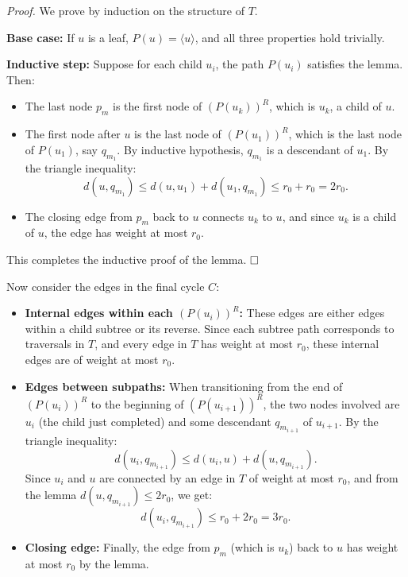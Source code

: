 \documentclass[11pt]{article}
\begin{document}
\begin{description}
\begin{enumerate}
\textit{Proof.} We prove by induction on the structure of $T$.

\textbf{Base case:} If $u$ is a leaf, $P(u) = \langle u \rangle$, and all three properties hold trivially.

\textbf{Inductive step:} Suppose for each child $u_i$, the path $P(u_i)$ satisfies the lemma. Then:
\begin{itemize}
  \item The last node $p_m$ is the first node of $(P(u_k))^R$, which is $u_k$, a child of $u$.
  \item The first node after $u$ is the last node of $(P(u_1))^R$, which is the last node of $P(u_1)$, say $q_{m_1}$. By inductive hypothesis, $q_{m_1}$ is a descendant of $u_1$. By the triangle inequality:
  \[
  d(u, q_{m_1}) \le d(u, u_1) + d(u_1, q_{m_1}) \le r_0 + r_0 = 2r_0.
  \]
  \item The closing edge from $p_m$ back to $u$ connects $u_k$ to $u$, and since $u_k$ is a child of $u$, the edge has weight at most $r_0$.
\end{itemize}
This completes the inductive proof of the lemma. $\hfill\square$

\medskip

Now consider the edges in the final cycle $C$:
\begin{itemize}
  \item \textbf{Internal edges within each $(P(u_i))^R$:}  
  These edges are either edges within a child subtree or its reverse. Since each subtree path corresponds to traversals in $T$, and every edge in $T$ has weight at most $r_0$, these internal edges are of weight at most $r_0$.
  
  \item \textbf{Edges between subpaths:}  
  When transitioning from the end of $(P(u_i))^R$ to the beginning of $(P(u_{i+1}))^R$, the two nodes involved are $u_i$ (the child just completed) and some descendant $q_{m_{i+1}}$ of $u_{i+1}$. By the triangle inequality:
  \[
  d(u_i, q_{m_{i+1}}) \le d(u_i, u) + d(u, q_{m_{i+1}}).
  \]
  Since $u_i$ and $u$ are connected by an edge in $T$ of weight at most $r_0$, and from the lemma $d(u, q_{m_{i+1}}) \le 2r_0$, we get:
  \[
  d(u_i, q_{m_{i+1}}) \le r_0 + 2r_0 = 3r_0.
  \]
  
  \item \textbf{Closing edge:}  
  Finally, the edge from $p_m$ (which is $u_k$) back to $u$ has weight at most $r_0$ by the lemma.
\end{itemize}


\end{enumerate}
\end{description}
\end{document}
